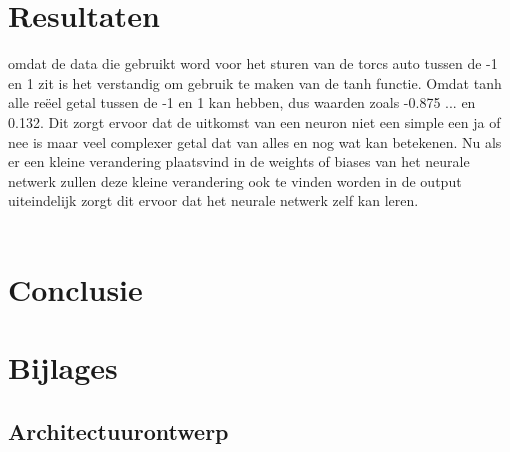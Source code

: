 \documentclass{article}
\begin{document}
\section{Resultaten}


omdat de data die gebruikt word voor het sturen van de torcs auto tussen de -1 en 1 zit is het verstandig om gebruik te maken van de tanh functie. Omdat tanh alle reëel getal tussen de -1 en 1 kan hebben, dus waarden zoals -0.875 ... en 0.132. Dit zorgt ervoor dat de uitkomst van een neuron niet een simple een ja of nee is maar veel complexer getal dat van alles en nog wat kan betekenen. Nu als er een kleine verandering plaatsvind in de weights of biases van het neurale netwerk zullen deze kleine verandering ook te vinden worden in de output uiteindelijk zorgt dit ervoor dat het neurale netwerk zelf kan leren.\\\\





\section{Conclusie}
\pagebreak
\section{Bijlages}
\subsection{Architectuurontwerp}

\pagebreak


\pagebreak
\end{document}
